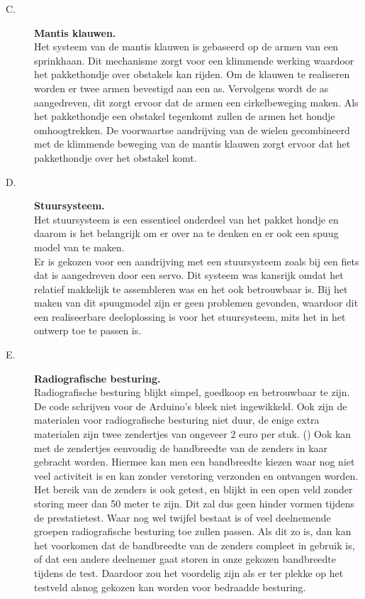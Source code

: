 \begin{description}
\item[C.] {\bf Mantis klauwen.}\\
Het systeem van de mantis klauwen is gebaseerd op de armen van een sprinkhaan. Dit mechanisme zorgt voor een klimmende werking waardoor het pakkethondje over obstakels kan rijden. Om de klauwen te realiseren worden er twee armen bevestigd aan een as. Vervolgens wordt de as aangedreven, dit zorgt ervoor dat de armen een cirkelbeweging maken. Als het pakkethondje een obstakel tegenkomt zullen de armen het hondje omhoogtrekken. De voorwaartse aandrijving van de wielen gecombineerd met de klimmende beweging van de mantis klauwen zorgt ervoor dat het pakkethondje over het obstakel komt. 

\item[D.] {\bf Stuursysteem.}\\
Het stuursysteem is een essentieel onderdeel van het pakket hondje en daarom is het belangrijk om er over na te denken en er ook een spuug model van te maken.\\
Er is gekozen voor een aandrijving met een stuursysteem zoals bij een fiets dat is aangedreven door een servo. Dit systeem was kansrijk omdat het relatief makkelijk te assembleren was en het ook betrouwbaar is. Bij het maken van dit spuugmodel zijn er geen problemen gevonden, waardoor dit een realiseerbare deeloplossing is voor het stuursysteem, mits het in het ontwerp toe te passen is.\\

\item[E.] {\bf Radiografische besturing. }\\
Radiografische besturing blijkt simpel, goedkoop en betrouwbaar te zijn. De code schrijven voor de Arduino's bleek niet ingewikkeld. Ook zijn de materialen voor radiografische besturing niet duur, de enige extra materialen zijn twee zendertjes van ongeveer 2 euro per stuk. (\cite{amazon.de_RC_REMOTE}) Ook kan met de zendertjes eenvoudig de bandbreedte van de zenders in kaar gebracht worden. Hiermee kan men een bandbreedte kiezen waar nog niet veel activiteit is en kan zonder verstoring verzonden en ontvangen worden. \\
Het bereik van de zenders is ook getest, en blijkt in een open veld zonder storing meer dan 50 meter te zijn. Dit zal dus geen hinder vormen tijdens de prestatietest. Waar nog wel twijfel bestaat is of veel deelnemende groepen radiografische besturing toe zullen passen. Als dit zo is, dan kan het voorkomen dat de bandbreedte van de zenders compleet in gebruik is, of dat een andere deelnemer gaat storen in onze gekozen bandbreedte tijdens de test. Daardoor zou het voordelig zijn als er ter plekke op het testveld alsnog gekozen kan worden voor bedraadde besturing. 

\end{description}


